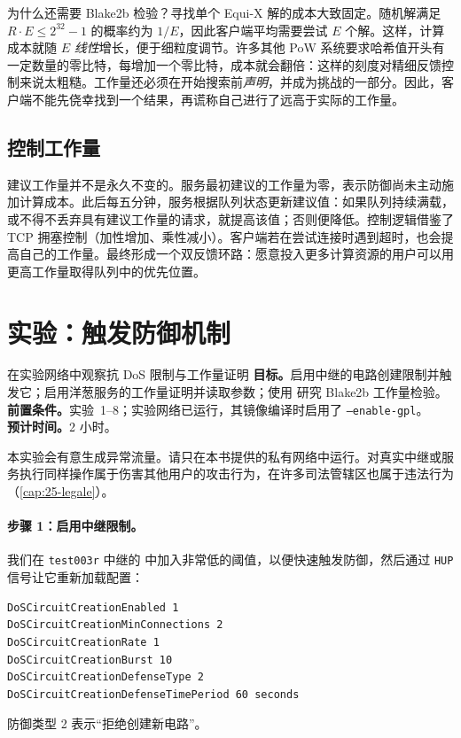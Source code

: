 为什么还需要 Blake2b 检验？寻找单个 Equi-X 解的成本大致固定。随机解满足 $R \cdot E \le 2^{32}-1$ 的概率约为 $1/E$，因此客户端平均需要尝试 $E$ 个解。这样，计算成本就随 $E$ \emph{线性}增长，便于细粒度调节。许多其他 PoW 系统要求哈希值开头有一定数量的零比特，每增加一个零比特，成本就会翻倍：这样的刻度对精细反馈控制来说太粗糙。工作量还必须在开始搜索前\emph{声明}，并成为挑战的一部分。因此，客户端不能先侥幸找到一个结果，再谎称自己进行了远高于实际的工作量。

\subsection{控制工作量}

建议工作量并不是永久不变的。服务最初建议的工作量为零，表示防御尚未主动施加计算成本。此后每五分钟，服务根据队列状态更新建议值：如果队列持续满载，或不得不丢弃具有建议工作量的请求，就提高该值；否则便降低。控制逻辑借鉴了 TCP 拥塞控制（加性增加、乘性减小）。客户端若在尝试连接时遇到超时，也会提高自己的工作量。最终形成一个双反馈环路：愿意投入更多计算资源的用户可以用更高工作量取得队列中的优先位置。

\section{实验：触发防御机制}\label{sec:lab-dos}

\begin{laboratorio}[9]{在实验网络中观察抗 DoS 限制与工作量证明}
\textbf{目标。}启用中继的电路创建限制并触发它；启用洋葱服务的工作量证明并读取参数；使用  研究 Blake2b 工作量检验。\\
\textbf{前置条件。}实验~1--8；实验网络已运行，其镜像编译时启用了 \texttt{--enable-gpl}。\\
\textbf{预计时间。}2 小时。
\end{laboratorio}

\begin{attenzione}[仅限自己的网络]
本实验会有意生成异常流量。请只在本书提供的私有网络中运行。对真实中继或服务执行同样操作属于伤害其他用户的攻击行为，在许多司法管辖区也属于违法行为（\cref{cap:25-legale}）。
\end{attenzione}

\paragraph{步骤 1：启用中继限制。}我们在 \texttt{test003r} 中继的  中加入非常低的阈值，以便快速触发防御，然后通过 \texttt{HUP} 信号让它重新加载配置：
\begin{lstlisting}[language=torrc,numbers=none]
DoSCircuitCreationEnabled 1
DoSCircuitCreationMinConnections 2
DoSCircuitCreationRate 1
DoSCircuitCreationBurst 10
DoSCircuitCreationDefenseType 2
DoSCircuitCreationDefenseTimePeriod 60 seconds
\end{lstlisting}
防御类型 2 表示\enquote{拒绝创建新电路}。

